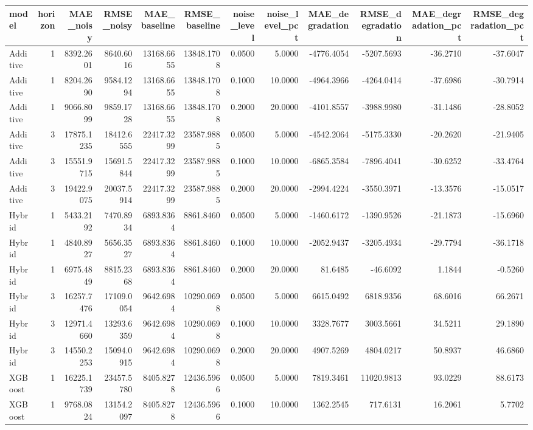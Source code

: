 \begin{tabular}{lrrrrrrrrrrr}
\toprule
model & horizon & MAE_noisy & RMSE_noisy & MAE_baseline & RMSE_baseline & noise_level & noise_level_pct & MAE_degradation & RMSE_degradation & MAE_degradation_pct & RMSE_degradation_pct \\
\midrule
Additive & 1 & 8392.2601 & 8640.6016 & 13168.6655 & 13848.1708 & 0.0500 & 5.0000 & -4776.4054 & -5207.5693 & -36.2710 & -37.6047 \\
Additive & 1 & 8204.2690 & 9584.1294 & 13168.6655 & 13848.1708 & 0.1000 & 10.0000 & -4964.3966 & -4264.0414 & -37.6986 & -30.7914 \\
Additive & 1 & 9066.8099 & 9859.1728 & 13168.6655 & 13848.1708 & 0.2000 & 20.0000 & -4101.8557 & -3988.9980 & -31.1486 & -28.8052 \\
Additive & 3 & 17875.1235 & 18412.6555 & 22417.3299 & 23587.9885 & 0.0500 & 5.0000 & -4542.2064 & -5175.3330 & -20.2620 & -21.9405 \\
Additive & 3 & 15551.9715 & 15691.5844 & 22417.3299 & 23587.9885 & 0.1000 & 10.0000 & -6865.3584 & -7896.4041 & -30.6252 & -33.4764 \\
Additive & 3 & 19422.9075 & 20037.5914 & 22417.3299 & 23587.9885 & 0.2000 & 20.0000 & -2994.4224 & -3550.3971 & -13.3576 & -15.0517 \\
Hybrid & 1 & 5433.2192 & 7470.8934 & 6893.8364 & 8861.8460 & 0.0500 & 5.0000 & -1460.6172 & -1390.9526 & -21.1873 & -15.6960 \\
Hybrid & 1 & 4840.8927 & 5656.3527 & 6893.8364 & 8861.8460 & 0.1000 & 10.0000 & -2052.9437 & -3205.4934 & -29.7794 & -36.1718 \\
Hybrid & 1 & 6975.4849 & 8815.2368 & 6893.8364 & 8861.8460 & 0.2000 & 20.0000 & 81.6485 & -46.6092 & 1.1844 & -0.5260 \\
Hybrid & 3 & 16257.7476 & 17109.0054 & 9642.6984 & 10290.0698 & 0.0500 & 5.0000 & 6615.0492 & 6818.9356 & 68.6016 & 66.2671 \\
Hybrid & 3 & 12971.4660 & 13293.6359 & 9642.6984 & 10290.0698 & 0.1000 & 10.0000 & 3328.7677 & 3003.5661 & 34.5211 & 29.1890 \\
Hybrid & 3 & 14550.2253 & 15094.0915 & 9642.6984 & 10290.0698 & 0.2000 & 20.0000 & 4907.5269 & 4804.0217 & 50.8937 & 46.6860 \\
XGBoost & 1 & 16225.1739 & 23457.5780 & 8405.8278 & 12436.5966 & 0.0500 & 5.0000 & 7819.3461 & 11020.9813 & 93.0229 & 88.6173 \\
XGBoost & 1 & 9768.0824 & 13154.2097 & 8405.8278 & 12436.5966 & 0.1000 & 10.0000 & 1362.2545 & 717.6131 & 16.2061 & 5.7702 \\

\end{tabular}
